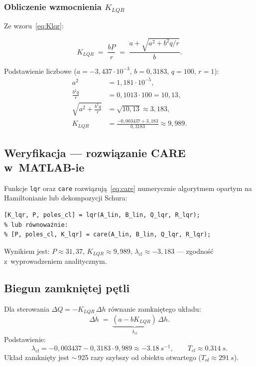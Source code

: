 \documentclass[11pt,a4paper]{article}
\begin{document}
\subsubsection*{Obliczenie wzmocnienia $K_{LQR}$}

Ze wzoru~\eqref{eq:Klqr}:
\begin{wzor}
\begin{equation}
K_{LQR} \;=\; \frac{bP}{r}
       \;=\; \frac{a + \sqrt{a^{2} + b^{2}q/r}}{b}.
\end{equation}
\end{wzor}

\noindent Podstawienie liczbowe ($a=-3{,}437\!\cdot\!10^{-3}$, $b=0{,}3183$,
$q=100$, $r=1$):
\begin{align}
a^{2} &= 1{,}181\cdot 10^{-5}, \\
\tfrac{b^{2}q}{r} &= 0{,}1013 \cdot 100 = 10{,}13, \\
\sqrt{a^{2} + \tfrac{b^{2}q}{r}} &= \sqrt{10{,}13} \approx 3{,}183, \\
K_{LQR} &= \frac{-0{,}003437 + 3{,}183}{0{,}3183} \approx 9{,}989.
\end{align}

\subsection{Weryfikacja --- rozwiązanie CARE w~MATLAB-ie}

Funkcje \texttt{lqr} oraz \texttt{care} rozwiązują~\eqref{eq:care}
numerycznie algorytmem opartym na Hamiltonianie lub dekompozycji Schura:

\begin{lstlisting}[style=matlab]
[K_lqr, P, poles_cl] = lqr(A_lin, B_lin, Q_lqr, R_lqr);
% lub równoważnie:
% [P, poles_cl, K_lqr] = care(A_lin, B_lin, Q_lqr, R_lqr);
\end{lstlisting}
\noindent Wynikiem jest: $P\approx 31{,}37$, $K_{LQR}\approx 9{,}989$,
$\lambda_{cl}\approx -3{,}183$ --- zgodność z~wyprowadzeniem analitycznym.

\subsection{Biegun zamkniętej pętli}

Dla sterowania $\Delta Q = -K_{LQR}\,\Delta h$ równanie zamkniętego układu:
\begin{equation}
\Delta\dot h \;=\; \underbrace{(a - b K_{LQR})}_{\lambda_{cl}}\,\Delta h.
\end{equation}
Podstawienie:
\begin{equation}
\lambda_{cl} = -0{,}003437 - 0{,}3183\cdot 9{,}989 \approx -\SI{3.18}{s^{-1}},
\qquad T_{cl} \approx \SI{0.314}{s}.
\end{equation}
Układ zamknięty jest $\sim$\,925 razy szybszy od obiektu otwartego
($T_{ol}\approx \SI{291}{s}$).
\end{document}
